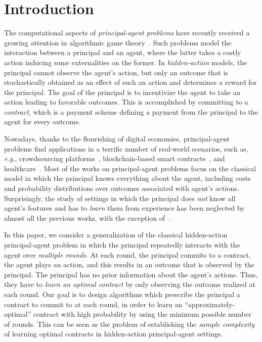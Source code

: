 \section{Introduction}


The computational aspects of \emph{principal-agent problems} have recently received a growing attention in algorithmic game theory~\citep{dutting2019simple,alon2021contracts,guruganesh2021contracts,dutting2021complexity,dutting2022combinatorial,castiglioni2022bayesian,alon2023bayesian,castiglioni2023designing,castiglioni2023multi,dutting2023multi,GuruganeshPower23,deo2024supermodular,dutting2024combinatorial}.
%
Such problems model the interaction between a principal and an agent, where the latter takes a costly action inducing some externalities on the former.
%
In \emph{hidden-action} models, the principal cannot observe the agent's action, but only an outcome that is stochastically obtained as an effect of such an action and determines a reward for the principal. 
%
The goal of the principal is to incentivize the agent to take an action leading to favorable outcomes.
%
This is accomplished by committing to a \emph{contract}, which is a payment scheme defining a payment from the principal to the agent for every outcome.  


Nowadays, thanks to the flourishing of digital economies, principal-agent problems find applications in a terrific number of real-world scenarios, such as, \emph{e.g.}, crowdsourcing platforms~\citep{ho2015adaptive}, blockchain-based smart contracts~\citep{cong2019blockchain}, and healthcare~\citep{bastani2016analysis}. Most of the works on principal-agent problems focus on the classical model in which the principal knows everything about the agent, including costs and probability distributions over outcomes associated with agent's actions.
%
Surprisingly, the study of settings in which the principal does \emph{not} know all agent's features and has to \emph{learn} them from experience has been neglected by almost all the previous works, with the exception of~\citep{ho2015adaptive,zhu2022sample,cohen2022learning,han2023learning}.


In this paper, we consider a generalization of the classical hidden-action principal-agent problem in which the principal repeatedly interacts with the agent over \emph{multiple rounds}.
%
At each round, the principal commits to a contract, the agent plays an action, and this results in an outcome that is observed by the principal.
% 
The principal has no prior information about the agent's actions.
%
Thus, they have to \emph{learn an optimal contract} by only observing the outcome realized at each round.
%
Our goal is to design algorithms which prescribe the principal a contract to commit to at each round, in order to learn an ``approximately-optimal'' contract with high probability by using the minimum possible number of rounds.
%
This can be seen as the problem of establishing the \emph{sample complexity} of learning optimal contracts in hidden-action principal-agent settings.


